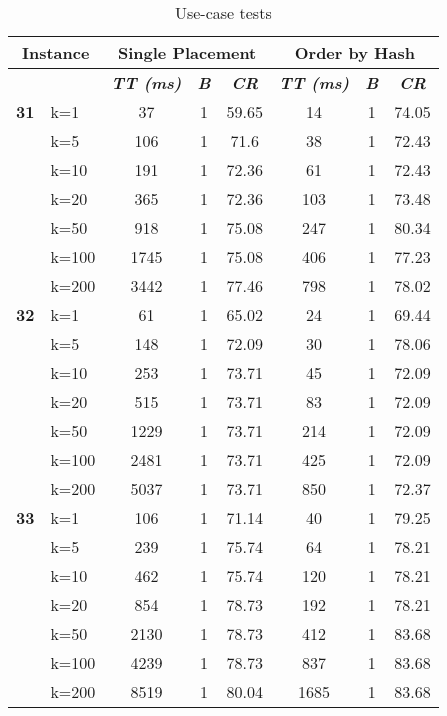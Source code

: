     \begin{table}[htbp]
    \caption{Use-case tests}
    \centering
    \begin{tabular}{|l|l|c|c|c|c|c|c|}
    
    \multicolumn{ 2}{|c|}{\textbf{Instance}} & \multicolumn{ 3}{c|}{\textbf{Single Placement}} & \multicolumn{ 3}{c|}{\textbf{Order by Hash}} \\ \hline
    \multicolumn{ 2}{|l|}{} & \textbf{\textit{TT (ms)}} & \textbf{\textit{B}} & \textbf{\textit{CR}} & \textbf{\textit{TT (ms)}} & \textbf{\textit{B}} & \textbf{\textit{CR}} \\ \hline
    \multicolumn{1}{|r|}{\textbf{31}} & k=1 & 37 & 1 & 59.65 & 14 & 1 & 74.05 \\ 
     & k=5 & 106 & 1 & 71.6 & 38 & 1 & 72.43 \\ 
     & k=10 & 191 & 1 & 72.36 & 61 & 1 & 72.43 \\ 
     & k=20 & 365 & 1 & 72.36 & 103 & 1 & 73.48 \\ 
     & k=50 & 918 & 1 & 75.08 & 247 & 1 & 80.34 \\ 
     & k=100 & 1745 & 1 & 75.08 & 406 & 1 & 77.23 \\ 
     & k=200 & 3442 & 1 & 77.46 & 798 & 1 & 78.02 \\ \hline
    \multicolumn{1}{|r|}{\textbf{32}} & k=1 & 61 & 1 & 65.02 & 24 & 1 & 69.44 \\ 
     & k=5 & 148 & 1 & 72.09 & 30 & 1 & 78.06 \\ 
     & k=10 & 253 & 1 & 73.71 & 45 & 1 & 72.09 \\ 
     & k=20 & 515 & 1 & 73.71 & 83 & 1 & 72.09 \\ 
     & k=50 & 1229 & 1 & 73.71 & 214 & 1 & 72.09 \\ 
     & k=100 & 2481 & 1 & 73.71 & 425 & 1 & 72.09 \\ 
     & k=200 & 5037 & 1 & 73.71 & 850 & 1 & 72.37 \\ \hline
    \multicolumn{1}{|r|}{\textbf{33}} & k=1 & 106 & 1 & 71.14 & 40 & 1 & 79.25 \\ 
     & k=5 & 239 & 1 & 75.74 & 64 & 1 & 78.21 \\ 
     & k=10 & 462 & 1 & 75.74 & 120 & 1 & 78.21 \\ 
     & k=20 & 854 & 1 & 78.73 & 192 & 1 & 78.21 \\ 
     & k=50 & 2130 & 1 & 78.73 & 412 & 1 & 83.68 \\ 
     & k=100 & 4239 & 1 & 78.73 & 837 & 1 & 83.68 \\ 
     & k=200 & 8519 & 1 & 80.04 & 1685 & 1 & 83.68 \\ \hline

\end{tabular}
\end{table}
